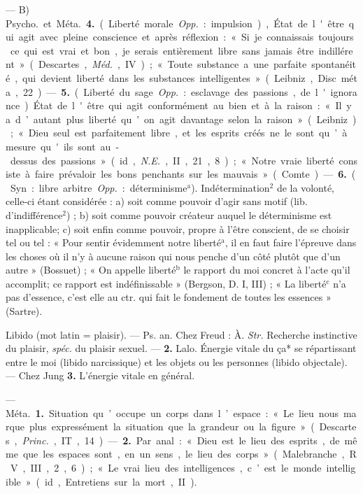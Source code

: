 \begin{itemize}[leftmargin=1cm, label=, itemsep=1pt]
— B) \si{Psycho.} et \si{Méta.} {\bf 4.} (Liberté
morale. {\it Opp.} : impulsion), État de
l'être qui agit avec pleine conscience
et après réflexion : « Si je connaissais toujours ce qui est vrai et bon,...
je serais entièrement libre sans
jamais être indillérent » (Descartes,
\si{{\it Méd.}}, IV) ; « Toute substance a une
parfaite spontanéité, qui devient
liberté dans les substances intelligentes » (Leibniz, Disc. méta., 22). —
 {\bf 5.} (Liberté du sage. {\it Opp.} : esclavage
des passions, de l'ignorance). État
de l'être qui agit conformément au
bien et à la raison : « Il y a d’autant
plus liberté qu’on agit davantage
selon la raison » (Leibniz) ; « Dieu
seul est parfaitement libre, et les
esprits créés ne le sont qu’à mesure
qu'ils sont au-dessus des passions »
(id., {\it N.E.}, II, 21, 8) ; « Notre vraie
liberté consiste à faire prévaloir
les bons penchants sur les mauvais »
(Comte). — {\bf 6.} (Syn. : libre arbitre.
{\it Opp.} : déterminisme$^\text{a}$). Indétermination$^2$ de la volonté, celle-ci étant
considérée : a) soit comme pouvoir
d’agir sans motif (lib. d’indifférence$^2$) ;
b) soit comme pouvoir créateur
auquel le déterminisme est inapplicable; c) soit enfin comme pouvoir, propre à l'être conscient, de
se choisir tel ou tel : « Pour sentir
évidemment notre liberté$^\text{a}$, il en
faut faire l'épreuve dans les choses
où il n’y à aucune raison qui nous
penche d’un côté plutôt que d’un
autre » (Bossuet) ; « On appelle liberté$^\text{b}$ le rapport du moi concret à
l'acte qu'il accomplit; ce rapport
est indéfinissable » (Bergson, D. I,
III) ; « La liberté$^\text{c}$ n’a pas d'essence,
c’est elle au ctr. qui fait le fondement de toutes les essences » (Sartre).

Libido (mot latin = plaisir). — Ps.
an. Chez Freud : À. {\it Str.} Recherche
instinctive du plaisir, {\it spéc.} du plaisir
sexuel. — {\bf 2.} Lalo. Énergie vitale
du ça* se répartissant entre le moi
(libido narcissique) et les objets ou
les personnes (libido objectale). —
Chez Jung {\bf 3.} L'énergie vitale
en général.

 — \si{Méta.} {\bf 1.} Situation qu’occupe
un corps dans l’espace : « Le lieu
nous marque plus expressément la
situation que la grandeur ou la
figure » (Descartes, {\it Princ.}, IT, 14).
— {\bf 2.} Par anal. : « Dieu est le lieu
des esprits, de même que les espaces
sont, en un sens, le lieu des corps »
(Malebranche, R. V., III, 2, 6) ; « Le
vrai lieu des intelligences, c’est le
monde intelligible » (id., Entretiens
sur la mort, II).


\end{itemize}
